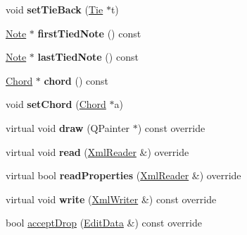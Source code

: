 \begin{DoxyCompactItemize}
\item 
\mbox{\label{class_ms_1_1_note_a9bdc2e024e29b58a2a25678a957782d5}} 
void {\bfseries set\+Tie\+Back} (\hyperlink{class_ms_1_1_tie}{Tie} $\ast$t)
\item 
\mbox{\label{class_ms_1_1_note_a9fcfa1264a1fdcda670283e4ce5d3684}} 
\hyperlink{class_ms_1_1_note}{Note} $\ast$ {\bfseries first\+Tied\+Note} () const
\item 
\mbox{\label{class_ms_1_1_note_a993e33acc58ee96b018a27f3a5dbd6df}} 
\hyperlink{class_ms_1_1_note}{Note} $\ast$ {\bfseries last\+Tied\+Note} () const
\item 
\mbox{\label{class_ms_1_1_note_ac1fe59b8f92c11fc6b662855fc8d9316}} 
\hyperlink{class_ms_1_1_chord}{Chord} $\ast$ {\bfseries chord} () const
\item 
\mbox{\label{class_ms_1_1_note_a4c0e30bba76a1838189fa6ab117122ca}} 
void {\bfseries set\+Chord} (\hyperlink{class_ms_1_1_chord}{Chord} $\ast$a)
\item 
\mbox{\label{class_ms_1_1_note_a6747aad598d4bffa3e99e6a2fd105be6}} 
virtual void {\bfseries draw} (Q\+Painter $\ast$) const override
\item 
\mbox{\label{class_ms_1_1_note_a34fcc408905091e3b2cb6d74720585a0}} 
virtual void {\bfseries read} (\hyperlink{class_ms_1_1_xml_reader}{Xml\+Reader} \&) override
\item 
\mbox{\label{class_ms_1_1_note_a2c2428a09b9f1ef9d9f4fcea27629990}} 
virtual bool {\bfseries read\+Properties} (\hyperlink{class_ms_1_1_xml_reader}{Xml\+Reader} \&) override
\item 
\mbox{\label{class_ms_1_1_note_a53925c055ba0b5cf446b142cbea77995}} 
virtual void {\bfseries write} (\hyperlink{class_ms_1_1_xml_writer}{Xml\+Writer} \&) const override
\item 
bool \hyperlink{class_ms_1_1_note_abaffbc8698b96263bb1d9b3f4b69c63e}{accept\+Drop} (\hyperlink{class_ms_1_1_edit_data}{Edit\+Data} \&) const override
\item 

\end{DoxyCompactItemize}
